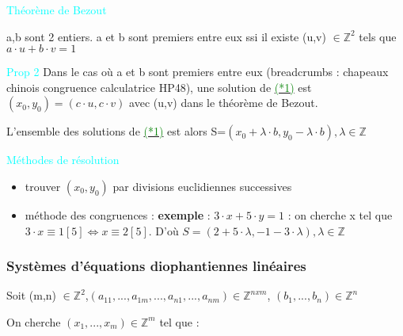 \documentclass{article}
\begin{document}
\textcolor{cyan}{Théorème de Bezout}

a,b sont 2 entiers. a et b sont premiers entre eux ssi il existe (u,v) $\in \mathbb{Z}^2$ tels que  $a \cdot u + b \cdot v=1$

\textcolor{cyan}{Prop 2}
Dans le cas où a et b sont premiers entre eux (breadcrumbs : chapeaux chinois congruence calculatrice HP48), une solution de \hyperlink{here2}{\textcolor{green}{(*1)}} est $(x_0,y_0)=(c \cdot u, c \cdot v)$ avec (u,v) dans le théorème de Bezout.

L'ensemble des solutions de \hyperlink{here2}{\textcolor{green}{(*1)}} est alors S=${(x_0+\lambda \cdot b, y_0-\lambda \cdot b ), \lambda \in \mathbb{Z}}$


\textcolor{cyan}{Méthodes de résolution}


\begin{itemize}[label=\textbullet, font=\LARGE \color{blueish}]
\item trouver $(x_0,y_0)$ par divisions euclidiennes successives
\item méthode des congruences : \textbf{exemple} :   $3 \cdot x + 5 \cdot y=1$
  : on cherche x tel que $3 \cdot x \equiv 1 [5] \Leftrightarrow  x \equiv 2 [5]$. D'où $S={(2 +  5 \cdot \lambda, -1-3 \cdot \lambda ), \lambda \in \mathbb{Z}}$

\end{itemize}

\subsubsection{Systèmes d'équations diophantiennes linéaires}
Soit (m,n) $\in \mathbb{Z}^2$,$(a_{11},...,a_{1m},...,a_{n1},...,a_{nm})  \in \mathbb{Z} ^ {nxm}$, $(b_1,...,b_n)   \in \mathbb{Z} ^ n $

On cherche $(x_1,...,x_m)  \in \mathbb{Z} ^ m$ tel que :

\end{document}
